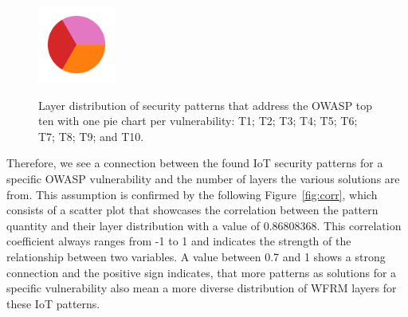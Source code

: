 \begin{figure}[ht]
{		\includegraphics[height=1in]{img/T6}}
	\caption[Layer distribution of pattern solutions for OWASP top ten]{Layer distribution of security patterns that address the OWASP top ten with one pie chart per vulnerability: 
		 T1;
		 T2;
		 T3; 
		 T4; 
		 T5; 
		 T6; 
		 T7;
		 T8;  
		 T9; and
		 T10.}
	\label{fig:pies}
\end{figure}

Therefore, we see a connection between the found IoT security patterns for a specific OWASP vulnerability and the number of layers the various solutions are from. This assumption is confirmed by the following Figure~\ref{fig:corr}, which consists of a scatter plot that showcases the correlation between the pattern quantity and their layer distribution with a value of 0.86808368. This correlation coefficient always ranges from -1 to 1 and indicates the strength of the relationship between two variables. A value between 0.7 and 1 shows a strong connection and the positive sign indicates, that more patterns as solutions for a specific vulnerability also mean a more diverse distribution of WFRM layers for these IoT patterns. 

